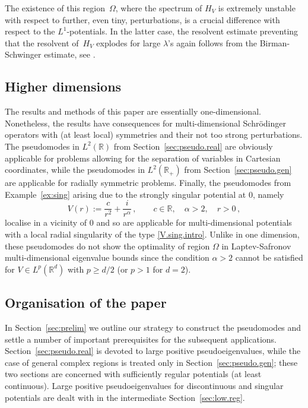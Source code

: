 The existence of this region~$\Omega$, 
where the spectrum of $H_V$ is extremely unstable with respect to further, even tiny, perturbations, is a crucial difference with respect to the $L^1$-potentials. 
In the latter case, the resolvent estimate preventing that the resolvent of~$H_V$ explodes for large $\lambda$'s again follows from the Birman-Schwinger estimate, see \cite{Abramov-Aslanyan-Davies_2001}. 

\subsection*{Higher dimensions}
The results and methods of this paper are essentially one-dimensional.
Nonetheless, the results have consequences for multi-dimensional Schr\"odinger operators with (at least local) symmetries and their not too strong perturbations. The pseudomodes in $L^2({\mathbb{R}})$ from Section~\ref{sec:pseudo.real} are obviously applicable for problems allowing for the separation of variables in Cartesian coordinates, while the pseudomodes in $L^2({\mathbb{R}}_+)$ from Section~\ref{sec:pseudo.gen} are applicable for radially symmetric problems. Finally, the pseudomodes from Example~\ref{ex:sing} arising due to the strongly singular potential at $0$, namely 
\begin{equation}\label{V.sing.intro}
V(r) := \frac{c}{r^2} + \frac{i}{r^\alpha}
\,, \qquad
c \in {\mathbb{R}}, \quad \alpha > 2, \quad r>0 
\,,
\end{equation}
localise in a vicinity of $0$ and so are applicable for multi-dimensional potentials
with a local radial singularity of the type \eqref{V.sing.intro}. Unlike in one dimension, these pseudomodes do not show the optimality of region $\Omega$ in Laptev-Safronov multi-dimensional eigenvalue bounds since the condition $\alpha>2$ cannot be satisfied for $V\in L^p({\mathbb{R}}^d)$ with $p \geq d/2$ (or $p>1$ for $d=2$). 
\subsection*{Organisation of the paper}
In Section~\ref{sec:prelim} we outline our strategy 
to construct the pseudomodes and settle a number of important prerequisites
for the subsequent applications.
Section~\ref{sec:pseudo.real} is devoted to large positive pseudoeigenvalues,
while the case of general complex regions is treated only 
in Section~\ref{sec:pseudo.gen};
these two sections are concerned with sufficiently regular
potentials (at least continuous).
Large positive pseudoeigenvalues
for discontinuous and singular potentials
are dealt with in the intermediate Section~\ref{sec:low.reg}.

